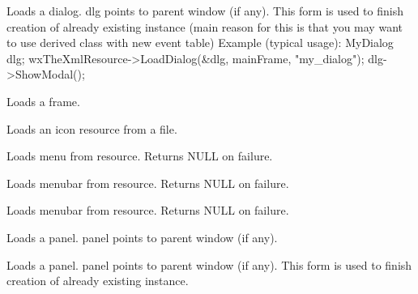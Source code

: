 Loads a dialog. dlg points to parent window (if any). This form
is used to finish creation of already existing instance (main reason
for this is that you may want to use derived class with new event table)
Example (typical usage):
MyDialog dlg;
wxTheXmlResource->LoadDialog(\&dlg, mainFrame, "my\_dialog");
dlg->ShowModal();


\label{wxxmlresourceloadframe}


Loads a frame.


\label{wxxmlresourceloadicon}


Loads an icon resource from a file.


\label{wxxmlresourceloadmenu}


Loads menu from resource. Returns NULL on failure.


\label{wxxmlresourceloadmenubar}


Loads menubar from resource. Returns NULL on failure.



Loads menubar from resource. Returns NULL on failure.


\label{wxxmlresourceloadpanel}


Loads a panel. panel points to parent window (if any).



Loads a panel. panel points to parent window (if any). This form
is used to finish creation of already existing instance.


\label{wxxmlresourceloadtoolbar}


